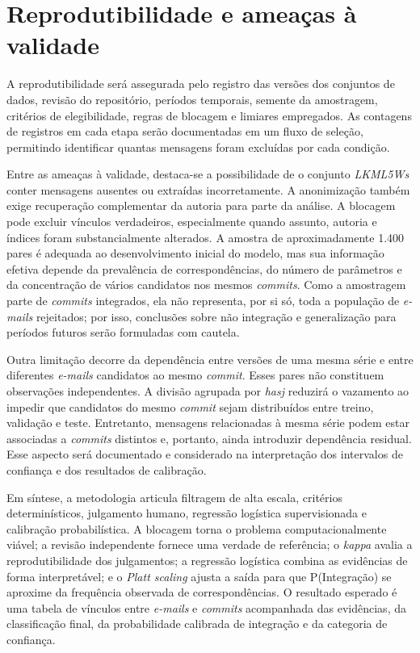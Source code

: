 \section{Reprodutibilidade e ameaças à validade}
A reprodutibilidade será assegurada pelo registro das versões dos conjuntos de dados, revisão do repositório, períodos temporais, semente da amostragem, critérios de elegibilidade, regras de blocagem e limiares empregados. As contagens de registros em cada etapa serão documentadas em um fluxo de seleção, permitindo identificar quantas mensagens foram excluídas por cada condição.

Entre as ameaças à validade, destaca-se a possibilidade de o conjunto \textit{LKML5Ws} conter mensagens ausentes ou extraídas incorretamente. A anonimização também exige recuperação complementar da autoria para parte da análise. A blocagem pode excluir vínculos verdadeiros, especialmente quando assunto, autoria e índices foram substancialmente alterados. A amostra de aproximadamente 1.400 pares é adequada ao desenvolvimento inicial do modelo, mas sua informação efetiva depende da prevalência de correspondências, do número de parâmetros e da concentração de vários candidatos nos mesmos \textit{commits}. Como a amostragem parte de \textit{commits} integrados, ela não representa, por si só, toda a população de \textit{e-mails} rejeitados; por isso, conclusões sobre não integração e generalização para períodos futuros serão formuladas com cautela.

Outra limitação decorre da dependência entre versões de uma mesma série e entre diferentes \textit{e-mails} candidatos ao mesmo \textit{commit}. Esses pares não constituem observações independentes. A divisão agrupada por \textit{hasj} reduzirá o vazamento ao impedir que candidatos do mesmo \textit{commit} sejam distribuídos entre treino, validação e teste. Entretanto, mensagens relacionadas à mesma série podem estar associadas a \textit{commits} distintos e, portanto, ainda introduzir dependência residual. Esse aspecto será documentado e considerado na interpretação dos intervalos de confiança e dos resultados de calibração.

Em síntese, a metodologia articula filtragem de alta escala, critérios determinísticos, julgamento humano, regressão logística supervisionada e calibração probabilística. A blocagem torna o problema computacionalmente viável; a revisão independente fornece uma verdade de referência; o \textit{kappa} avalia a reprodutibilidade dos julgamentos; a regressão logística combina as evidências de forma interpretável; e o \textit{Platt scaling} ajusta a saída para que P(Integração) se aproxime da frequência observada de correspondências. O resultado esperado é uma tabela de vínculos entre \textit{e-mails} e \textit{commits} acompanhada das evidências, da classificação final, da probabilidade calibrada de integração e da categoria de confiança.
